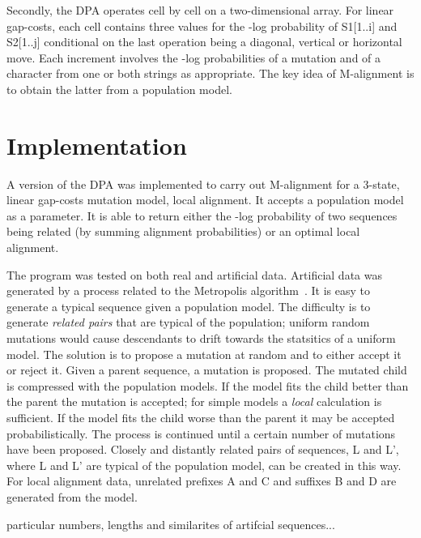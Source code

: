 \documentclass[letterpaper,11pt,oneside]{article}
\begin{document}
Secondly,
the DPA operates cell by cell on a two-dimensional array.
For linear gap-costs, each cell contains three values for the -log probability
of S1[1..i] and S2[1..j] conditional on the last operation
being a diagonal, vertical or horizontal move.
Each increment involves the -log probabilities of a mutation and
of a character from one or both strings as appropriate.
The key idea of M-alignment is to obtain the latter from a population model.


\section{Implementation} \label{sec:impl}

A version of the DPA was implemented to carry out M-alignment for
a 3-state, linear gap-costs mutation model, local alignment.
It accepts a population model as a parameter.
It is able to return either
the -log probability of two sequences being related
(by summing alignment probabilities) or
an optimal local alignment.

The program was tested on both real and artificial data.
Artificial data was generated by a process related to the
Metropolis algorithm~\cite{metropolis53}.
It is easy to generate a typical sequence given a population model.
The difficulty is to generate {\em related pairs} that are typical
of the population; uniform random mutations would cause
descendants to drift towards the statsitics of a uniform model.
The solution is to propose a mutation at random and to either accept it
or reject it.
Given a parent sequence, a mutation is proposed.
The mutated child is compressed with the population models.
If the model fits the child better than the parent the mutation is accepted;
for simple models a {\em local} calculation is sufficient.
If the model fits the child worse than the parent it may be accepted
probabilistically.
The process is continued until a certain number of mutations have been proposed.
Closely and distantly related pairs of sequences, L and L',
where L and L' are typical of the population model, can be created in this way.
For local alignment data,
unrelated prefixes A and C and suffixes B and D are generated from the model.

particular numbers, lengths and similarites of artifcial sequences...

\end{document}
